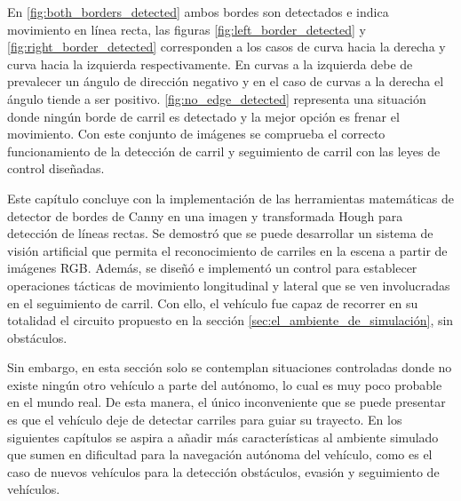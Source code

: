 En \ref{fig:both_borders_detected} ambos bordes son detectados e indica movimiento en línea recta, las figuras \ref{fig:left_border_detected} y \ref{fig:right_border_detected} corresponden a los casos de curva hacia la derecha y curva hacia la izquierda respectivamente. En curvas a la izquierda debe de prevalecer un ángulo de dirección negativo y en el caso de curvas a la derecha el ángulo tiende a ser positivo. \ref{fig:no_edge_detected} representa una situación donde ningún borde de carril es detectado y la mejor opción es frenar el movimiento. Con este conjunto de imágenes se comprueba el correcto funcionamiento de la detección de carril y seguimiento de carril con las leyes de control diseñadas.
\newpage

Este capítulo concluye con la implementación de las herramientas matemáticas de detector de bordes de Canny en una imagen y transformada Hough para detección de líneas rectas. Se demostró que se puede desarrollar un sistema de visión artificial que permita el reconocimiento de carriles en la escena a partir de imágenes RGB. Además, se diseñó e implementó un control para establecer operaciones tácticas de movimiento longitudinal y lateral que se ven involucradas en el seguimiento de carril. Con ello, el vehículo fue capaz de recorrer en su totalidad el circuito propuesto en la sección \ref{sec:el_ambiente_de_simulación}, sin obstáculos. 

Sin embargo, en esta sección solo se contemplan situaciones controladas donde no existe ningún otro vehículo a parte del autónomo, lo cual es muy poco probable en el mundo real. De esta manera, el único inconveniente que se puede presentar es que el vehículo deje de detectar carriles para guiar su trayecto. En los siguientes capítulos se aspira a añadir más características al ambiente simulado que sumen en dificultad para la navegación autónoma del vehículo, como es el caso de nuevos vehículos para la detección obstáculos, evasión y seguimiento de vehículos.